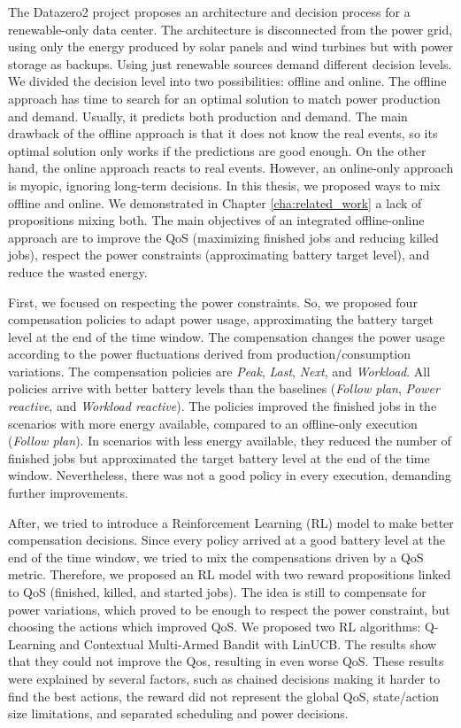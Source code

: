 The Datazero2 project proposes an architecture and decision process for a renewable-only data center. The architecture is disconnected from the power grid, using only the energy produced by solar panels and wind turbines but with power storage as backups. Using just renewable sources demand different decision levels. We divided the decision level into two possibilities: offline and online. The offline approach has time to search for an optimal solution to match power production and demand. Usually, it predicts both production and demand. The main drawback of the offline approach is that it does not know the real events, so its optimal solution only works if the predictions are good enough. On the other hand, the online approach reacts to real events. However, an online-only approach is myopic, ignoring long-term decisions. In this thesis, we proposed ways to mix offline and online. We demonstrated in Chapter \ref{cha:related_work} a lack of propositions mixing both. The main objectives of an integrated offline-online approach are to improve the QoS (maximizing finished jobs and reducing killed jobs), respect the power constraints (approximating battery target level), and reduce the wasted energy.

First, we focused on respecting the power constraints. So, we proposed four compensation policies to adapt power usage, approximating the battery target level at the end of the time window. The compensation changes the power usage according to the power fluctuations derived from production/consumption variations. The compensation policies are \emph{Peak}, \emph{Last}, \emph{Next}, and \emph{Workload}. All policies arrive with better battery levels than the baselines (\emph{Follow plan}, \emph{Power reactive}, and \emph{Workload reactive}). The policies improved the finished jobs in the scenarios with more energy available, compared to an offline-only execution (\emph{Follow plan}). In scenarios with less energy available, they reduced the number of finished jobs but approximated the target battery level at the end of the time window. Nevertheless, there was not a good policy in every execution, demanding further improvements.

After, we tried to introduce a Reinforcement Learning (RL) model to make better compensation decisions. Since every policy arrived at a good battery level at the end of the time window, we tried to mix the compensations driven by a QoS metric. Therefore, we proposed an RL model with two reward propositions linked to QoS (finished, killed, and started jobs). The idea is still to compensate for power variations, which proved to be enough to respect the power constraint, but choosing the actions which improved QoS. We proposed two RL algorithms: Q-Learning and Contextual Multi-Armed Bandit with LinUCB. The results show that they could not improve the Qos, resulting in even worse QoS. These results were explained by several factors, such as chained decisions making it harder to find the best actions, the reward did not represent the global QoS, state/action size limitations, and separated scheduling and power decisions.

